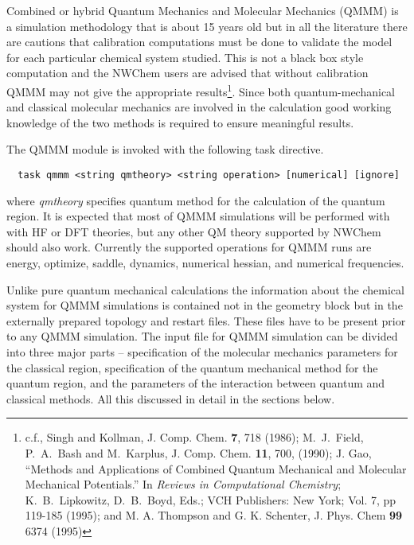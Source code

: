 
\label{sec:qmmm}

Combined or hybrid Quantum Mechanics and Molecular Mechanics (QMMM)
is a simulation methodology that is about 15 years old but in all the
literature there are cautions that calibration computations must be
done to validate the model for each particular chemical system
studied.  This is not a black box style computation and the NWChem
users are advised that without calibration QMMM may not give the
appropriate results\footnote{c.f., Singh and Kollman, J. Comp. Chem.
  {\bf 7}, 718 (1986); M.~J.~Field, P.~A.~Bash and M.~Karplus, J.
  Comp. Chem. {\bf 11}, 700, (1990); J. Gao, ``Methods and
  Applications of Combined Quantum Mechanical and Molecular Mechanical
  Potentials.'' In {\it Reviews in Computational Chemistry};
  K.~B.~Lipkowitz, D.~B.~Boyd, Eds.; VCH Publishers: New York;
  Vol. 7, pp 119-185 (1995); and M. A. Thompson and G. K. Schenter, J.
  Phys. Chem {\bf 99} 6374 (1995) }. Since both quantum-mechanical and classical
molecular mechanics are involved in the calculation good working knowledge of the two methods
is required to ensure meaningful results. 

The QMMM module is invoked with the following task directive.

\begin{verbatim}
  task qmmm <string qmtheory> <string operation> [numerical] [ignore]
\end{verbatim}
where {\it qmtheory} specifies quantum method for the calculation of the quantum region. It is expected that 
most of QMMM simulations will be performed with 
with HF or DFT theories, but any other QM theory supported by NWChem should also work.
Currently the supported operations for QMMM runs
are energy, optimize, saddle, dynamics, numerical hessian, and numerical
frequencies. 


Unlike pure 
quantum mechanical calculations the information about the chemical system
for QMMM simulations is contained not in the geometry block but in the externally prepared topology and restart files.
These files have to be present prior to any QMMM simulation. 
The input file for QMMM simulation can be divided into three major parts -- specification of the molecular 
mechanics parameters for the classical region, specification of the quantum mechanical method for the quantum region, 
and the parameters of the interaction between quantum and classical methods. 
All this discussed in detail in the sections below.


